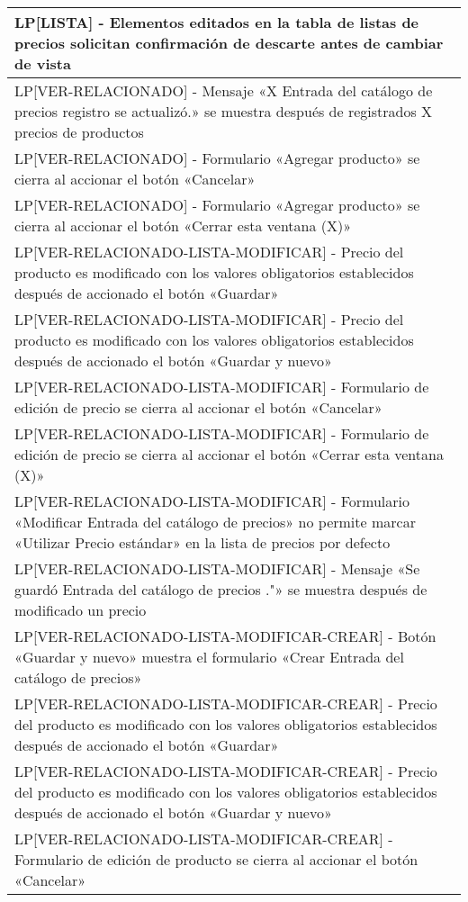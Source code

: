 \begin{longtable}{|p{15.0cm}|}
LP[LISTA] - Elementos editados en la tabla de listas de precios solicitan confirmación de descarte antes de cambiar de vista \\ \hline
LP[VER-RELACIONADO] - Mensaje «X Entrada del catálogo de precios registro se actualizó.» se muestra después de registrados X precios de productos \\ \hline
LP[VER-RELACIONADO] - Formulario «Agregar producto» se cierra al accionar el botón «Cancelar» \\ \hline
LP[VER-RELACIONADO] - Formulario «Agregar producto» se cierra al accionar el botón «Cerrar esta ventana (X)» \\ \hline
LP[VER-RELACIONADO-LISTA-MODIFICAR] - Precio del producto es modificado con los valores obligatorios establecidos después de accionado el botón «Guardar» \\ \hline
LP[VER-RELACIONADO-LISTA-MODIFICAR] - Precio del producto es modificado con los valores obligatorios establecidos después de accionado el botón «Guardar y nuevo» \\ \hline
LP[VER-RELACIONADO-LISTA-MODIFICAR] - Formulario de edición de precio se cierra al accionar el botón «Cancelar» \\ \hline
LP[VER-RELACIONADO-LISTA-MODIFICAR] - Formulario de edición de precio se cierra al accionar el botón «Cerrar esta ventana (X)» \\ \hline
LP[VER-RELACIONADO-LISTA-MODIFICAR] - Formulario «Modificar Entrada del catálogo de precios» no permite marcar «Utilizar Precio estándar» en la lista de precios por defecto \\ \hline
LP[VER-RELACIONADO-LISTA-MODIFICAR] - Mensaje «Se guardó Entrada del catálogo de precios ."» se muestra después de modificado un precio \\ \hline
LP[VER-RELACIONADO-LISTA-MODIFICAR-CREAR] - Botón «Guardar y nuevo» muestra el formulario «Crear Entrada del catálogo de precios» \\ \hline
LP[VER-RELACIONADO-LISTA-MODIFICAR-CREAR] - Precio del producto es modificado con los valores obligatorios establecidos después de accionado el botón «Guardar» \\ \hline
LP[VER-RELACIONADO-LISTA-MODIFICAR-CREAR] - Precio del producto es modificado con los valores obligatorios establecidos después de accionado el botón «Guardar y nuevo» \\ \hline
LP[VER-RELACIONADO-LISTA-MODIFICAR-CREAR] - Formulario de edición de producto se cierra al accionar el botón «Cancelar» \\ \hline

\end{longtable}
